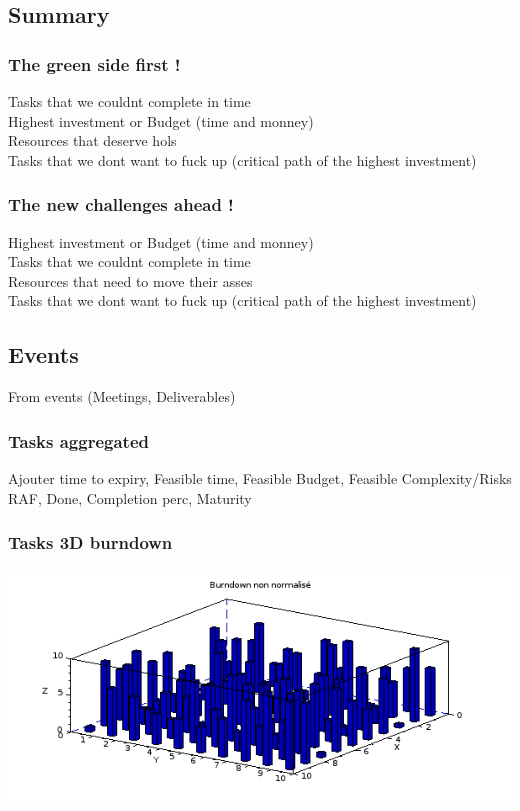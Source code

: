 \documentclass[8pt]{article} %
\begin{document}


\subsection{Summary}

\subsubsection{The green side first !}
Tasks that we couldnt complete in time\\
Highest investment or Budget (time and monney)\\
Resources that deserve hols\\
Tasks that we dont want to fuck up (critical path of the highest investment)\\

\subsubsection{The new challenges ahead !}
Highest investment or Budget (time and monney)\\
Tasks that we couldnt complete in time\\
Resources that need to move their asses\\
Tasks that we dont want to fuck up (critical path of the highest investment)\\

\subsection{Events}
From events (Meetings, Deliverables)


\subsubsection{Tasks aggregated}
Ajouter time to expiry, Feasible time, Feasible Budget, Feasible Complexity/Risks
RAF, Done, Completion perc, Maturity\\



%
\subsubsection{Tasks 3D burndown}
\includegraphics[width=1\textwidth]{Project.png}
\end{document}
